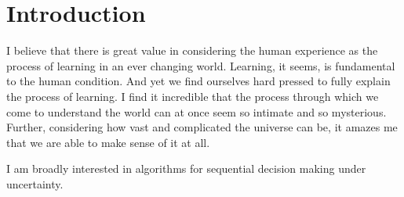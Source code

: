 \section*{Introduction}
I believe that there is great value in considering the human experience as the process of learning in an ever changing world. Learning, it seems, is fundamental to the human condition. And yet we find ourselves hard pressed to fully explain the process of learning. I find it incredible that the process through which we come to understand the world can at once seem so intimate and so mysterious. Further, considering how vast and complicated the universe can be, it amazes me that we are able to make sense of it at all.

I am broadly interested in algorithms for sequential decision making under uncertainty. 